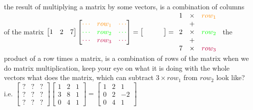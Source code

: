 \documentclass[12pt, a4paper]{article}
\begin{document}
\newline
{\textcolor{anhao-purple}{the result of multiplying a matrix by some vectors, is a combination of columns of the matrix}}
\vspace{14pt}
\newline
\begin{math}
	\begin{bmatrix}
		1 & 2 & 7
	\end{bmatrix}
	\begin{bmatrix}
		{\textcolor{anhao-orange}{\cdots}} & {\textcolor{anhao-orange}{row_1}} & {\textcolor{anhao-orange}{\cdots}} \\
		{\textcolor{green}{\cdots}} & {\textcolor{green}{row_2}} & {\textcolor{green}{\cdots}} \\
		{\textcolor{purple}{\cdots}} & {\textcolor{purple}{row_3}} & {\textcolor{purple}{\cdots}}
	\end{bmatrix}
	 = 
	\begin{bmatrix}
		\ & \ & \
	\end{bmatrix}
	 = 
	\begin{array}{rcl}
		1 & \times &  {\textcolor{anhao-orange}{row_1}} \\
		 & + & \\
		2 & \times & {\textcolor{green}{row_2}} \\
		 & + & \\
		7 & \times & {\textcolor{purple}{row_3}}
	\end{array}
\end{math}
\newline
{\textcolor{anhao-purple}{the product of a row times a matrix, is a combination of rows of the matrix}}
\vspace{14pt}
\newline
when we do matrix multiplication, keep your eye on what it is doing with the whole vectors
\vspace{14pt}
\newline
what does the matrix, which can subtract $3 \times row_1$ from $row_2$ look like?
\newline
i.e. 
\begin{math}
	\begin{bmatrix}
		? & ? & ? \\
		? & ? & ? \\
		? & ? & ? 
	\end{bmatrix}
	\begin{bmatrix}
		1 & 2 & 1 \\
		3 & 8 & 1 \\
		0 & 4 & 1 
	\end{bmatrix}
	 = 
	\begin{bmatrix}
		1 & 2 & 1 \\
		0 & 2 & -2 \\
		0 & 4 & 1 
	\end{bmatrix}
\end{math}
\end{document}
